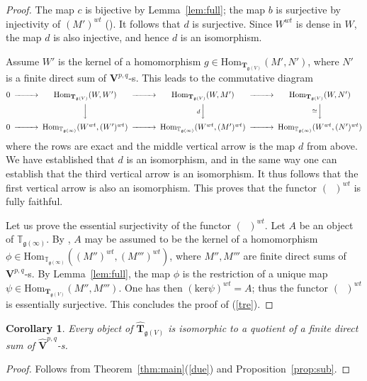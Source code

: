 \documentclass[12pt,reqno]{amsart}
\newcommand{\Hom}{\mathrm{Hom}}
\newtheorem{cor}[thm]{Corollary}
\theoremstyle{definition}
\theoremstyle{remark}
\begin{document}
\begin{proof}
	
	The map $c$ is bijective by Lemma~\ref{lem:full}; the map $b$ is surjective by injectivity of $(M')^{wt}$ (\cite[Proposition~4.5]{DPS}). It follows that $d$ is surjective.
	Since $W^{wt}$ is dense in $W$, the map $d$ is also injective, and hence $d$ is an isomorphism.
	
	Assume $W'$  is the kernel of a homomorphism
	$g\in \Hom_{\mathbf{T}_{\mathfrak{g}(V)}}(M', N')$, where $N'$ is a finite direct sum of $\mathbf{V}^{p,q}$-s. This leads to the commutative diagram
	\[
        \begin{CD}
	0 @>>>\Hom_{\mathbf{T}_{\mathfrak{g}(V)}}(W, W')@>>> \Hom_{\mathbf{T}_{\mathfrak{g}(V)}}(W, M') @>>> \Hom_{\mathbf{T}_{\mathfrak{g}(V)}}(W, N')\\
	@. @VVV @V{d}VV  @V{\cong}VV\\
	0 @>>>\Hom_{\mathbb{T}_{\mathfrak{g}(\infty)}}(W^{wt}, (W')^{wt})@>>> \Hom_{\mathbb{T}_{\mathfrak{g}(\infty)}}(W^{wt}, (M')^{wt}) @>>> \Hom_{\mathbb{T}_{\mathfrak{g}(\infty)}}(W^{wt}, (N')^{wt})
	\end{CD}
    \]
	where the rows are exact and the middle vertical arrow is the map $d$ from above. We have established that $d$ is an isomorphism, and in the same way one can establish that the third vertical arrow is an isomorphism. It thus follows that the first vertical arrow is also an isomorphism. This proves that the functor $(\phantom{a})^{wt}$ is fully faithful. 
	
	Let us prove the essential surjectivity of the functor $(\phantom{a})^{wt}$. Let $A$ be an object of $\mathbb{T}_{\mathfrak{g}(\infty)}$. By \cite[Proposition~4.5]{DPS}, $A$ may be assumed to be the kernel of a homomorphism $\phi\in \Hom_{\mathbb{T}_{\mathfrak{g}(\infty)}}((M'')^{wt}, (M''')^{wt})$, where $M'', M'''$ are finite direct sums of $\mathbf{V}^{p,q}$-s. By Lemma~\ref{lem:full}, the map $\phi$ is the restriction of a unique map $\psi\in \Hom_{\mathbf{T}_{\mathfrak{g}(V)}}(M'', M''')$. One has then $(\mathrm{ker}\psi)^{wt}=A$; thus the functor $(\phantom{a})^{wt}$ is essentially surjective. This concludes the proof of (\ref{tre}).
        \end{proof}

        \begin{cor} \label{quot}
	    Every object of $\widehat{\mathbf{T}}_{\mathfrak{g}(V)}$ is isomorphic to a quotient of a finite direct sum of $\widehat{\mathbf{V}}^{p,q}$-s.
	\end{cor}
        \begin{proof}
            Follows from Theorem~\ref{thm:main}(\ref{due}) and Proposition~\ref{prop:sub}.
        \end{proof}
	
\end{document}
